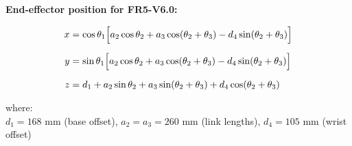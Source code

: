 \documentclass[border=10pt]{standalone}
\begin{document}
\textbf{End-effector position for FR5-V6.0:}

\bigskip

\[
\begin{aligned}
x &= \cos\theta_1\Bigl[a_2\cos\theta_2 + a_3\cos(\theta_2+\theta_3) - d_4\sin(\theta_2+\theta_3)\Bigr] \\[6pt]
y &= \sin\theta_1\Bigl[a_2\cos\theta_2 + a_3\cos(\theta_2+\theta_3) - d_4\sin(\theta_2+\theta_3)\Bigr] \\[6pt]
z &= d_1 + a_2\sin\theta_2 + a_3\sin(\theta_2+\theta_3) + d_4\cos(\theta_2+\theta_3)
\end{aligned}
\]

\bigskip

where:\\[4pt]
$d_1 = 168$ mm (base offset), $a_2 = a_3 = 260$ mm (link lengths), $d_4 = 105$ mm (wrist offset)
\end{document}

